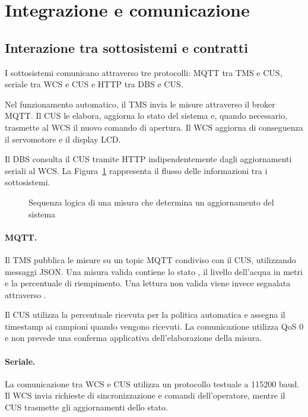 
\section{Integrazione e comunicazione}%
\label{sec:integration}

\subsection{Interazione tra sottosistemi e contratti}%
\label{subsec:integration-contracts}

I sottosistemi comunicano attraverso tre protocolli: MQTT tra TMS e CUS, seriale tra WCS e CUS e HTTP tra DBS e CUS.

Nel funzionamento automatico, il TMS invia le misure attraverso il broker MQTT.
Il CUS le elabora, aggiorna lo stato del sistema e, quando necessario, trasmette al WCS il nuovo comando di apertura.
Il WCS aggiorna di conseguenza il servomotore e il display LCD.

Il DBS consulta il CUS tramite HTTP indipendentemente dagli aggiornamenti seriali al WCS.
La Figura~\ref{fig:sequence} rappresenta il flusso delle informazioni tra i sottosistemi.

\begin{figure}[htbp]
\centering

\caption{Sequenza logica di una misura che determina un aggiornamento del sistema}%
\label{fig:sequence}
\end{figure}

\paragraph{MQTT.}

Il TMS pubblica le misure su un topic MQTT condiviso con il CUS, utilizzando messaggi JSON.
Una misura valida contiene lo stato , il livello dell'acqua in metri e la percentuale di riempimento.
Una lettura non valida viene invece segnalata attraverso .

Il CUS utilizza la percentuale ricevuta per la politica automatica e assegna il timestamp ai campioni quando vengono ricevuti.
La comunicazione utilizza QoS 0 e non prevede una conferma applicativa dell'elaborazione della misura.

\paragraph{Seriale.}

La comunicazione tra WCS e CUS utilizza un protocollo testuale a 115200 baud.
Il WCS invia richieste di sincronizzazione e comandi dell'operatore, mentre il CUS trasmette gli aggiornamenti dello stato.

